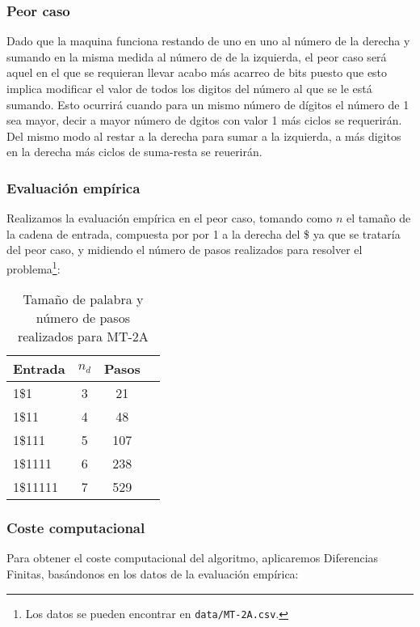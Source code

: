 


\subsubsection*{Peor caso}
Dado que la maquina funciona restando de uno en uno al número de la derecha y sumando en la misma medida al número de de la izquierda, el peor caso será aquel en el que se requieran llevar acabo más acarreo de bits puesto que esto implica modificar el valor de todos los digitos del número al que se le está sumando. Esto ocurrirá cuando para un mismo número de dígitos el número de 1 sea mayor, decir a mayor número de dgitos con valor 1 más ciclos se requerirán.\\
Del mismo modo al restar a la derecha para sumar a la izquierda, a más digitos en la derecha más ciclos de suma-resta se reuerirán.

\subsubsection*{Evaluación empírica}
Realizamos la evaluación empírica en el peor caso, tomando como $n$ el tamaño de la cadena de entrada, compuesta por por 1 a la derecha del \$ ya que se trataría del peor caso, y midiendo el número de pasos realizados para resolver el problema\footnote{Los datos se pueden encontrar en \texttt{data/MT-2A.csv}.}:

\begin{table}[h]
    \centering
    \begin{tabular}{lccc}
        Entrada & $n_d$ & Pasos \\
        \hline
        1\$1                     & 3  & 21   \\
        1\$11                    & 4  & 48   \\
        1\$111                   & 5  & 107  \\
        1\$1111                  & 6  & 238  \\
        1\$11111                 & 7  & 529  \\
    \end{tabular}
    \caption{Tamaño de palabra y número de pasos realizados para MT-2A}
\end{table}


\subsubsection*{Coste computacional}
Para obtener el coste computacional del algoritmo, aplicaremos Diferencias Finitas, basándonos en los datos de la evaluación empírica:


